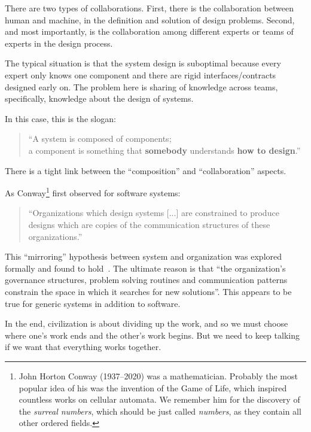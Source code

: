 There are two types of collaborations. First, there is the collaboration  between human and machine, in the definition and solution of design problems. Second, and most importantly, is the collaboration among different experts or teams of experts in the design process.

The typical situation is that the system design is suboptimal because every expert only knows one component and there are rigid interfaces/contracts designed early on. The problem here is sharing of knowledge across teams, specifically, knowledge about the design of systems.

In this case, this is the slogan:
 
\begin{quote}
    \enquote{A system is composed of components;\\
      a component is something that \textbf{somebody} understands
      \textbf{how to design}.}
\end{quote}


There is a tight link between the ``composition'' and ``collaboration'' aspects.

As Conway\footnote{John Horton Conway (1937--2020) was a mathematician. Probably the most 
popular idea of his was the invention of the Game of Life, which inspired countless
works on cellular automata. We remember him for the discovery of the \emph{surreal numbers},
which should be just called \emph{numbers}, as they contain all other ordered fields.} first observed for software systems:

\begin{quote}
\enquote{Organizations which design systems [...] are constrained to produce designs which are copies of the communication structures of these organizations.}
\end{quote}
 

This ``mirroring'' hypothesis between system and organization was explored formally and found to hold~\cite{maccormack12exploring}. The ultimate reason is that ``the organization's governance structures, problem solving routines and communication patterns constrain the space in which it searches for new solutions''. This appears to be true for generic systems in addition to software.


In the end, civilization is about dividing up the work, and so we must choose where one's work ends and the other's work begins. But we need to keep talking if we want that everything works together.
 

